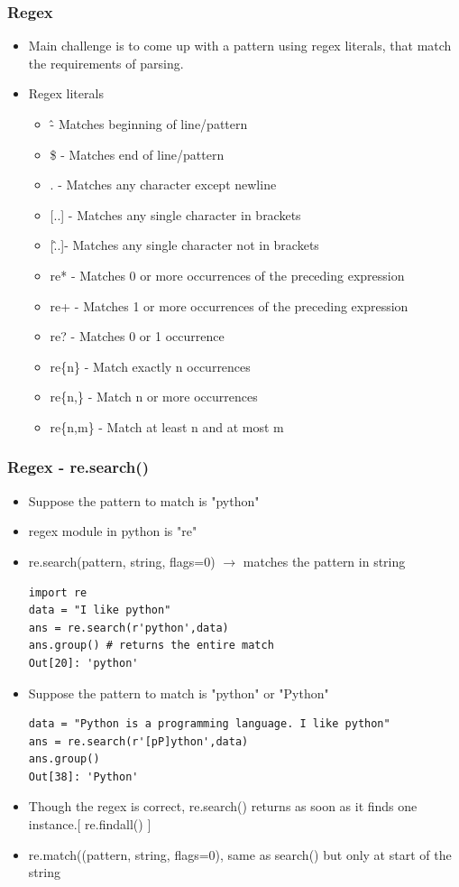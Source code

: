 \documentclass[xcolor=table]{beamer}
\begin{document}
\begin{frame}
\frametitle{Regex}
\begin{itemize}
\item Main challenge is to come up with a pattern using regex literals, that match the requirements of parsing.
\item Regex literals
	\begin{itemize}
		\item \^ - Matches beginning of line/pattern
		\item \$ - Matches end of line/pattern
		\item . - Matches any character except newline
		\item {[}..{]} - Matches any single character in brackets
		\item {[}\^..{]}- Matches any single character not in brackets
		\item re* - Matches 0 or more occurrences of the preceding expression
		\item re+ - Matches 1 or more occurrences of the preceding expression
		\item re? - Matches 0 or 1 occurrence
		\item re\{n\} - Match exactly n occurrences
		\item re\{n,\} - Match n or more occurrences
		\item re\{n,m\} - Match at least n and at most m
   	\end{itemize}
\end{itemize}
\end{frame}

\begin{frame}[fragile]
\frametitle{Regex - re.search()}
\begin{itemize}
\item Suppose the pattern to match is "python"
\item regex module in python is "re"
\item re.search(pattern, string, flags=0) $\rightarrow$ matches the pattern in string\\
\tiny
\begin{verbatim}
import re
data = "I like python"
ans = re.search(r'python',data)
ans.group() # returns the entire match
Out[20]: 'python'
\end{verbatim}
\small
\item Suppose the pattern to match is "python" or "Python"\\
\tiny
\begin{verbatim}
data = "Python is a programming language. I like python"
ans = re.search(r'[pP]ython',data)
ans.group()
Out[38]: 'Python'
\end{verbatim}
\small
\item Though the regex is correct, re.search() returns as soon as it finds one instance.{[} re.findall() {]}
\item re.match((pattern, string, flags=0), same as search() but only at start of the string 
\end{itemize}
\end{frame}
\end{document}
